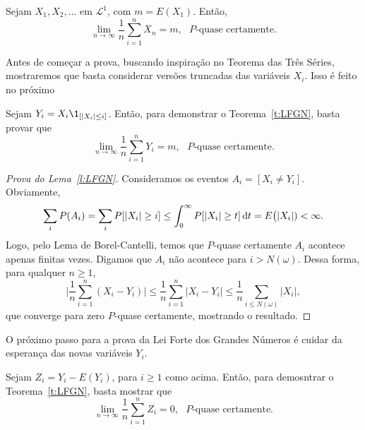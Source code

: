 \begin{theorem}
  \label{t:LFGN}
  Sejam $X_1, X_2, \dots$ \iid em $\mathcal{L}^1$, com $m = E(X_1)$.
  Então,
  \begin{equation}
    \lim_{n \to \infty} \frac{1}{n} \sum_{i=1}^n X_n = m, \text{ $P$-quase certamente.}
  \end{equation}
\end{theorem}

Antes de começar a prova, buscando inspiração no Teorema das Três Séries, mostraremos que basta considerar versões truncadas das variáveis $X_i$.
Isso é feito no próximo

\begin{lemma}
  \label{l:LFGN}
  Sejam $Y_i = X_i \1_{[|X_i| \leq i]}$.
  Então, para demonstrar o Teorema~\ref{t:LFGN}, basta provar que
  \begin{equation}
    \lim_{n \to \infty}\frac{1}{n} \sum_{i=1}^n Y_i = m, \text{ $P$-quase certamente.}
  \end{equation}
\end{lemma}

\begin{proof}[Prova do Lema~\ref{l:LFGN}]
  Consideramos os eventos $A_i = [X_i \neq Y_i]$.
  Obviamente,
  \begin{equation}
    \sum_i P(A_i) = \sum_i P[|X_i| \geq i] \leq \int_0^\infty P[|X_i| \geq t] \mathop{}\!\mathrm{d} t = E\big(|X_i|) < \infty.
  \end{equation}
  Logo, pelo Lema de Borel-Cantelli, temos que $P$-quase certamente $A_i$ acontece apenas finitas vezes.
  Digamos que $A_i$ não acontece para $i > N(\omega)$.
  Dessa forma, para qualquer $n \geq 1$,
  \begin{equation}
    \Big|\frac{1}{n}\sum_{i=1}^n (X_i - Y_i)\Big| \leq \frac{1}{n}\sum_{i=1}^n |X_i - Y_i| \leq \frac{1}{n} \sum_{i \leq N(\omega)} |X_i|,
  \end{equation}
  que converge para zero $P$-quase certamente, mostrando o resultado.
\end{proof}

O próximo passo para a prova da Lei Forte dos Grandes Números é cuidar da esperança das novas variáveis $Y_i$.
\begin{lemma}
  \label{l:lim_Z_n_LFGN}
  Sejam $Z_i = Y_i - E(Y_i)$, para $i \geq 1$ como acima.
  Então, para demosntrar o Teorema~\ref{t:LFGN}, basta mostrar que
  \begin{equation}
    \label{e:lim_Z_n_LFGN}
    \lim_{n \to \infty}\frac{1}{n} \sum_{i=1}^n Z_i = 0, \text{ $P$-quase certamente.}
  \end{equation}
\end{lemma}

